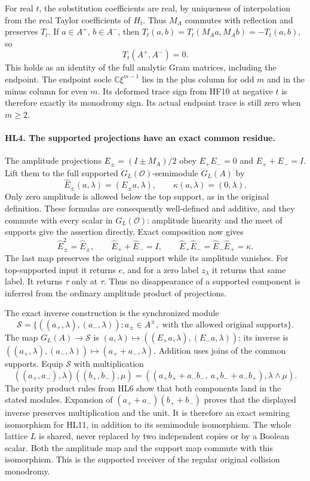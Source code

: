 For real $t$, the substitution coefficients are real, by uniqueness
of interpolation from the real Taylor coefficients of $H_t$.
Thus $M_A$ commutes with reflection and preserves $T_t$.
If $a\in A^+$, $b\in A^-$, then
$T_t(a,b)=T_t(M_Aa,M_Ab)=-T_t(a,b)$, so
\[
 T_t(A^+,A^-)=0.
 \tag{HL7}
\]
This holds as an identity of the full analytic Gram matrices,
including the endpoint. The endpoint socle $\mathbb C\xi^{m-1}$
lies in the plus column for odd $m$ and in the minus column for
even $m$. Its deformed trace sign from HF10 at negative $t$ is
therefore exactly its monodromy sign. Its actual endpoint trace
is still zero when $m\ge2$.

\paragraph{HL4. The supported projections have an exact common residue.}
The amplitude projections $E_\pm=(I\pm M_A)/2$ obey
$E_+E_-=0$ and $E_++E_-=I$. Lift them to the full supported
$G_L(\mathcal O)$-semimodule $G_L(A)$ by
\[
 \widehat E_\pm(a,\lambda)=(E_\pm a,\lambda),
       \qquad \kappa(a,\lambda)=(0,\lambda).
 \tag{HL8}
\]
Only zero amplitude is allowed below the top support, as in the
original definition. These formulas are consequently well-defined
and additive, and they commute with every scalar in
$G_L(\mathcal O)$: amplitude linearity and the meet of supports
give the assertion directly. Exact composition now gives
\[
 \widehat E_\pm^2=\widehat E_\pm,\qquad
 \widehat E_++\widehat E_-=I,\qquad
 \boxed{\widehat E_+\widehat E_-
            =\widehat E_-\widehat E_+=\kappa.}
 \tag{HL9}
\]
The last map preserves the original support while its amplitude
vanishes. For top-supported input it returns $e$, and for a zero
label $z_\lambda$ it returns that same label. It returns $\tau$
only at $\tau$. Thus no disappearance of a supported component
is inferred from the ordinary amplitude product of projections.

The exact inverse construction is the synchronized module
\[
 \mathcal S=\{((a_+,\lambda),(a_-,\lambda)):
       a_\pm\in A^\pm,\text{ with the allowed original supports}\}.
 \tag{HL10}
\]
The map $G_L(A)\to\mathcal S$ is
$(a,\lambda)\mapsto((E_+a,\lambda),(E_-a,\lambda))$;
its inverse is $((a_+,\lambda),(a_-,\lambda))\mapsto
(a_++a_-,\lambda)$. Addition uses joins of the common supports.
Equip $\mathcal S$ with multiplication
\[
 ((a_+,a_-),\lambda)((b_+,b_-),\mu)
   =((a_+b_++a_-b_-,\ a_+b_-+a_-b_+),\lambda\wedge\mu).
 \tag{HL11}
\]
The parity product rules from HL6 show that both components land
in the stated modules. Expansion of $(a_++a_-)(b_++b_-)$ proves
that the displayed inverse preserves multiplication and the unit.
It is therefore an exact semiring isomorphism for HL11, in
addition to its semimodule isomorphism. The whole lattice $L$
is shared, never replaced by two independent copies or by a
Boolean scalar. Both the amplitude map and the support map commute
with this isomorphism. This is the supported receiver of the
regular original collision monodromy.


